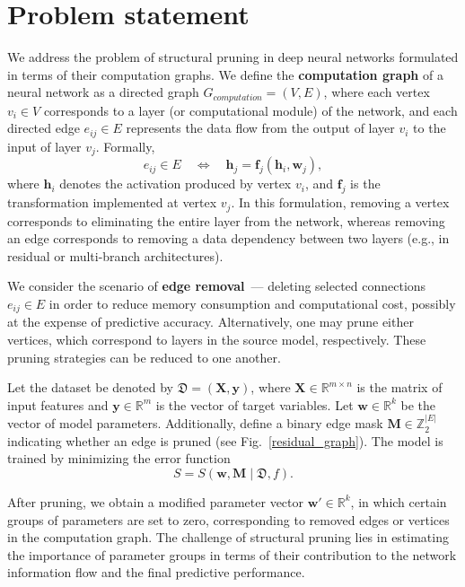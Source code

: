 \section{Problem statement}

We address the problem of structural pruning in deep neural networks formulated in terms of their computation graphs. We define the \textbf{computation graph} of a neural network as a directed graph $G_{computation} = (V, E)$, where each vertex $v_i \in V$ corresponds to a layer (or computational module) of the network, and each directed edge $e_{ij} \in E$ represents the data flow from the output of layer $v_i$ to the input of layer $v_j$. Formally,
\begin{equation}
e_{ij} \in E 
\quad \Leftrightarrow \quad 
\mathbf{h}_j = \mathbf{f}_j(\mathbf{h}_i, \mathbf{w}_j),
\end{equation}
where $\mathbf{h}_i$ denotes the activation produced by vertex $v_i$, and $\mathbf{f}_j$ is the transformation implemented at vertex $v_j$. In this formulation, removing a vertex corresponds to eliminating the entire layer from the network, whereas removing an edge corresponds to removing a data dependency between two layers (e.g., in residual or multi-branch architectures).

We consider the scenario of \textbf{edge removal}~--- deleting selected connections $e_{ij} \in E$ in order to reduce memory consumption and computational cost, possibly at the expense of predictive accuracy. Alternatively, one may prune either vertices, which correspond to layers in the source model, respectively. These pruning strategies can be reduced to one another.

Let the dataset be denoted by $\mathfrak{D} = (\mathbf{X}, \mathbf{y})$, where $\mathbf{X} \in \mathbb{R}^{m \times n}$ is the matrix of input features and $\mathbf{y} \in \mathbb{R}^m$ is the vector of target variables. Let $\mathbf{w} \in \mathbb{R}^k$ be the vector of model parameters. Additionally, define a binary edge mask $\mathbf{M} \in \mathbb{Z}_2^{|E|}$ indicating whether an edge is pruned (see Fig.~\ref{residual_graph}). The model is trained by minimizing the error function
\begin{equation}
\label{eq:loss_def}
S = S(\mathbf{w}, \mathbf{M} \mid \mathfrak{D}, f).
\end{equation}

After pruning, we obtain a modified parameter vector $\mathbf{w}' \in \mathbb{R}^k$, in which certain groups of parameters are set to zero, corresponding to removed edges or vertices in the computation graph. The challenge of structural pruning lies in estimating the importance of parameter groups in terms of their contribution to the network information flow and the final predictive performance.

